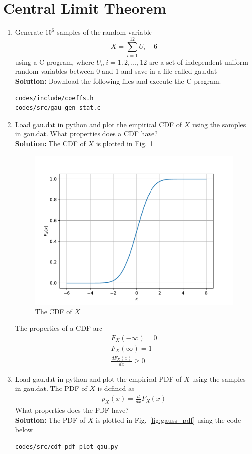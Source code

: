 \documentclass[journal,10pt,twocolumn]{article}
\newcommand\figref{Fig.~\ref}
\newcommand{\solution}{\noindent \textbf{Solution: }}
\begin{document}
\section{Central Limit Theorem}
\begin{enumerate}
%
%
\item
Generate $10^6$ samples of the random variable
%
\begin{equation}
X = \sum_{i=1}^{12}U_i -6
\end{equation}
%
using a C program, where $U_i, i = 1,2,\dots, 12$ are  a set of independent uniform random variables between 0 and 1
and save in a file called gau.dat\\
\solution Download the following files and execute the  C program.
\begin{lstlisting}
codes/include/coeffs.h
codes/src/gau_gen_stat.c
\end{lstlisting}
%
\item
Load gau.dat in python and plot the empirical CDF of $X$ using the samples in gau.dat. What properties does a CDF have?
\\
\solution The CDF of $X$ is plotted in \figref{fig:gauss_cdf}
\begin{figure}[H]
\centering
\includegraphics[width=\columnwidth]{./chapters/ch2/figs/gau_cdf.pdf}
\caption{The CDF of $X$}
\label{fig:gauss_cdf}
\end{figure}
The properties of a CDF are
\begin{eqnarray}
	F_X(-\infty) = 0\\
	F_X(\infty) = 1\\
	\frac{dF_X(x)}{dx} \ge 0
\end{eqnarray}
\item
Load gau.dat in python and plot the empirical PDF of $X$ using the samples in gau.dat. The PDF of $X$ is defined as
\begin{align}
p_{X}(x) = \frac{d}{dx}F_{X}(x)
\label{eq:cdf_to_pdf}
\end{align}
What properties does the PDF have?
\\
\solution The PDF of $X$ is plotted in \figref{fig:gauss_pdf} using the code below
\begin{lstlisting}
codes/src/cdf_pdf_plot_gau.py
\end{lstlisting}


\end{enumerate}
\end{document}
